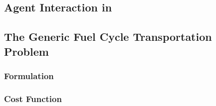 


\subsection{Agent Interaction in \Cyclus}\label{sec:agent-interaction}


\subsection{The Generic Fuel Cycle Transportation Problem}\label{sec:gfctp}

\subsubsection{Formulation}



\subsubsection{Cost Function}\label{sec:cost-function}












